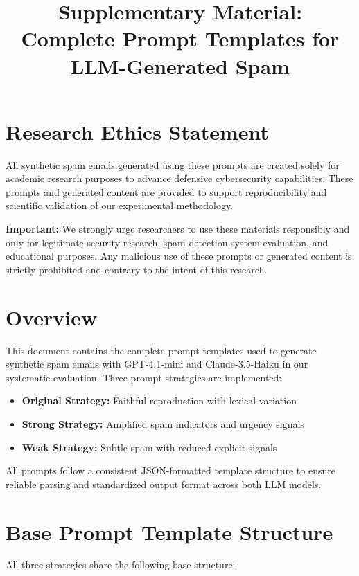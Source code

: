 \documentclass[11pt]{article}
\title{Supplementary Material:\\
Complete Prompt Templates for LLM-Generated Spam}
\author{}
\date{}
\begin{document}
\maketitle

\section*{Research Ethics Statement}

All synthetic spam emails generated using these prompts are created solely for academic research purposes to advance defensive cybersecurity capabilities. These prompts and generated content are provided to support reproducibility and scientific validation of our experimental methodology.

\textbf{Important:} We strongly urge researchers to use these materials responsibly and only for legitimate security research, spam detection system evaluation, and educational purposes. Any malicious use of these prompts or generated content is strictly prohibited and contrary to the intent of this research.

\section*{Overview}

This document contains the complete prompt templates used to generate synthetic spam emails with GPT-4.1-mini and Claude-3.5-Haiku in our systematic evaluation. Three prompt strategies are implemented:

\begin{itemize}
    \item \textbf{Original Strategy:} Faithful reproduction with lexical variation
    \item \textbf{Strong Strategy:} Amplified spam indicators and urgency signals
    \item \textbf{Weak Strategy:} Subtle spam with reduced explicit signals
\end{itemize}

All prompts follow a consistent JSON-formatted template structure to ensure reliable parsing and standardized output format across both LLM models.

\section*{Base Prompt Template Structure}

All three strategies share the following base structure:
\end{document}
